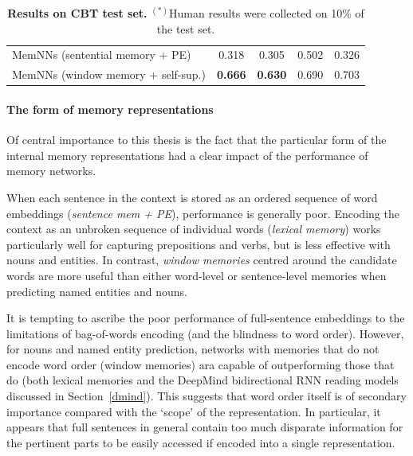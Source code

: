 \begin{table}[t]
\begin{center}
{{\begin{tabular}{l|cccc}
          MemNNs  (sentential memory + PE) & 0.318 & 0.305 & 0.502 & 0.326 \\
          MemNNs  (window memory + self-sup.) & \bf 0.666 & \bf 0.630 & 0.690 & 0.703\\
          \hline 
        \end{tabular}
      }
    }
    \caption{\label{tab:cbt_res} {\bf Results on CBT test set.} $^{(*)}$Human results were
      collected on 10\% of the test set.}\label{tab:cbt_res}
  \end{center}
  \vspace*{-4ex}
\end{table}

\paragraph{The form of memory representations} Of central importance to this thesis is the fact that the particular form of the internal memory representations had a clear impact of the performance of memory networks.

 When each sentence in the context is stored as an ordered sequence of word embeddings (\emph{sentence mem + PE}), performance is generally poor. Encoding the context as an unbroken sequence of individual words (\emph{lexical memory}) works particularly well for capturing prepositions and verbs, but is less effective with nouns and entities. In contrast, \emph{window memories} centred around the candidate words are more useful than either word-level or sentence-level memories when predicting named entities and nouns. 


It is tempting to ascribe the poor performance of full-sentence embeddings to the limitations of bag-of-words encoding (and the blindness to word order). However, for nouns and named entity prediction, networks with memories that do not encode word order (window memories) ara capable of outperforming those that do (both lexical memories and the DeepMind bidirectional RNN reading models~\citep{nips15_hermann} discussed in Section~\ref{dmind}). This suggests that word order itself is of secondary importance compared with the `scope' of the representation. In particular, it appears that full sentences in general contain too much disparate information for the pertinent parts to be easily accessed if encoded into a single representation. 

